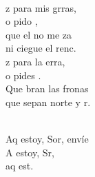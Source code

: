 \begin{cancion}[Envíame][Ixcís]
\begin{chorus}
	\end{chorus}%
	\jump\\
	z para mis grras, \\
	o pido , \\
	que el  no me za  \\
	ni  ciegue el renc.\\
	z para la erra,  \\
	o pides .\\
	Que bran las fronas \\
	que sepan norte y r.\\\jump\\
	\begin{chorus}%
	Aq estoy, Sor, envíe  \\
	A estoy, Sr, \\
	aq est.  \\
	\end{chorus}%
	\jump\\
\end{cancion}%
